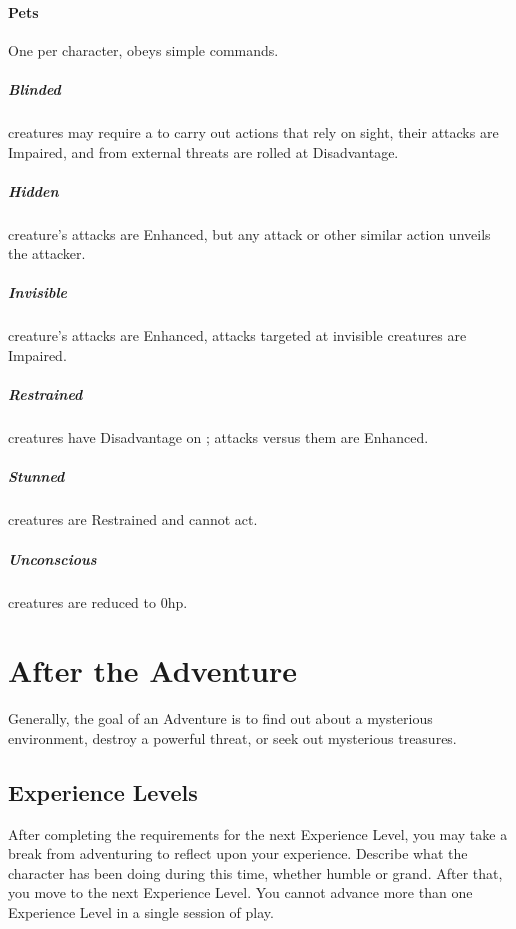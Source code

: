 \documentclass[itdr]{subfiles}
\begin{document}
\vfill
\paragraph{Pets}
One per character, obeys simple commands.

\vfill
{}

\subparagraph{Blinded} creatures may require a  to carry out actions that rely on sight, their attacks are Impaired, and  from external threats are rolled at Disadvantage.

\vfill
{}
\subparagraph{Hidden} creature's attacks are Enhanced, but any attack or other similar action unveils the attacker.

\vfill
{}
\subparagraph{Invisible} creature's attacks are Enhanced, attacks targeted at invisible creatures are Impaired.

\vfill
{}
\subparagraph{Restrained} creatures have Disadvantage on ; attacks versus them are Enhanced.

\vfill
{}
\subparagraph{Stunned} creatures are Restrained and cannot act.

\vfill
{}
\subparagraph{Unconscious} creatures are reduced to 0hp.

\vfill
\break

\section{After the Adventure}

Generally, the goal of an Adventure is to find out about a mysterious environment, destroy a powerful threat, or seek out mysterious treasures.

\subsection{Experience Levels}
After completing the requirements for the next Experience Level, you may take a break from adventuring to reflect upon your experience. Describe what the character has been doing during this time, whether humble or grand. After that, you move to the next Experience Level. You cannot advance more than one Experience Level in a single session of play.
\end{document}
